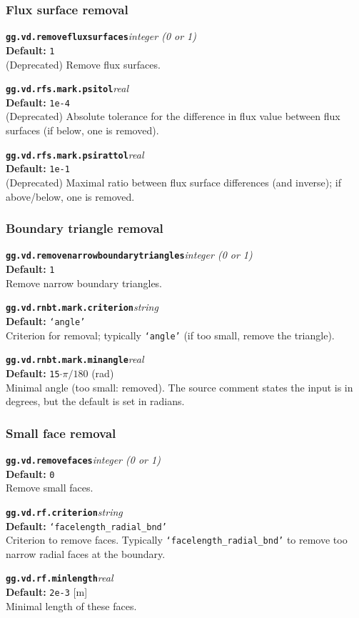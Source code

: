 \documentclass[10pt,a4paper]{article}
\newcommand{\sw}[4]{%
  \par\vspace{0.7em}%
  \begin{minipage}{\linewidth}\raggedright
    \textbf{\texttt{#1}}\hfill\textit{#2}\\[0.1em]
    \textbf{Default:} #3\\[0.1em]
    #4\par
    \vspace{0.3em}{\color{swgrey}\hrule}
  \end{minipage}\par}
\begin{document}
\subsubsection*{Flux surface removal}
\sw{gg.vd.removefluxsurfaces}{integer (0 or 1)}{\texttt{1}}{(Deprecated) Remove flux surfaces.}
\sw{gg.vd.rfs.mark.psitol}{real}{\texttt{1e-4}}{(Deprecated) Absolute tolerance for the difference in flux value between flux surfaces (if below, one is removed).}
\sw{gg.vd.rfs.mark.psirattol}{real}{\texttt{1e-1}}{(Deprecated) Maximal ratio between flux surface differences (and inverse); if above/below, one is removed.}

\subsubsection*{Boundary triangle removal}
\sw{gg.vd.removenarrowboundarytriangles}{integer (0 or 1)}{\texttt{1}}{Remove narrow boundary triangles.}
\sw{gg.vd.rnbt.mark.criterion}{string}{\texttt{`angle'}}{Criterion for removal; typically \texttt{`angle'} (if too small, remove the triangle).}
\sw{gg.vd.rnbt.mark.minangle}{real}{\texttt{15$\cdot\pi/180$} (rad)}{Minimal angle (too small: removed). The source comment states the input is in degrees, but the default is set in radians.}

\subsubsection*{Small face removal}
\sw{gg.vd.removefaces}{integer (0 or 1)}{\texttt{0}}{Remove small faces.}
\sw{gg.vd.rf.criterion}{string}{\texttt{`facelength\_radial\_bnd'}}{Criterion to remove faces. Typically \texttt{`facelength\_radial\_bnd'} to remove too narrow radial faces at the boundary.}
\sw{gg.vd.rf.minlength}{real}{\texttt{2e-3} [m]}{Minimal length of these faces.}

\end{document}
